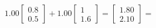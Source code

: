 \documentclass[preview]{standalone}
\begin{document}
\begin{align*}
1.00 \begin{bmatrix} 0.8 \\ 0.5 \end{bmatrix} + 1.00 \begin{bmatrix} 1 \\ 1.6 \end{bmatrix} = \begin{bmatrix} 1.80 \\ 2.10 \end{bmatrix} =
\end{align*}
\end{document}
